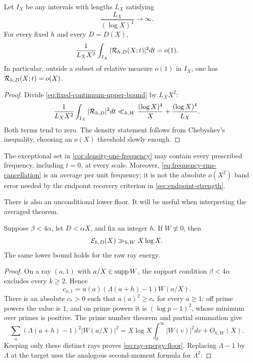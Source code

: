 \begin{corollary}
\label{cor:density-one-frequency}
Let $I_X$ be any intervals with lengths $L_X$ satisfying
\[
 \frac{L_X}{(\log X)^4}\longrightarrow\infty.
\]
For every fixed $h$ and every $D=D(X)$,
\begin{equation}
 \frac1{L_XX^2}\int_{I_X}|\mathcal R_{h,D}(X;t)|^2dt=o(1).
 \label{eq:frequency-rms-cancellation}
\end{equation}
In particular, outside a subset of relative measure $o(1)$ in $I_X$,
one has $\mathcal R_{h,D}(X;t)=o(X)$.
\end{corollary}

\begin{proof}
Divide \eqref{eq:fixed-continuum-upper-bound} by $L_XX^2$:
\[
 \frac1{L_XX^2}\int_{I_X}|\mathcal R_{h,D}|^2dt
 \ll_{h,W}\frac{(\log X)^4}{X}
 +\frac{(\log X)^4}{L_X}.
\]
Both terms tend to zero.  The density statement follows from Chebyshev's
inequality, choosing an $o(X)$ threshold slowly enough.
\end{proof}

\begin{remark}
The exceptional set in \cref{cor:density-one-frequency} may contain every
prescribed frequency, including $t=0$, at every scale.  Moreover,
\eqref{eq:frequency-rms-cancellation} is an average per unit frequency;
it is not the absolute $o(X^2)$ band error needed by the endpoint recovery
criterion in \cref{sec:endpoint-strength}.
\end{remark}

There is also an unconditional lower floor.  It will be useful when
interpreting the averaged theorem.

\begin{proposition}
\label{prop:ray-energy-floor}
Suppose $\beta<4\alpha$, let $D<\alpha X$, and fix an integer $h$.
If $W\not\equiv0$, then
\begin{equation}
 \mathcal E_{h,D}(X)\gg_{h,W}X\log X.
 \label{eq:ray-energy-floor}
\end{equation}
The same lower bound holds for the raw ray energy.
\end{proposition}

\begin{proof}
On a ray $(a,1)$ with $a/X\in\operatorname{supp} W$, the support condition
$\beta<4\alpha$ excludes every $k\geq2$.  Hence
\[
 c_{a,1}=u(a)(\Lambda(a+h)-1)W(a/X).
\]
There is an absolute $c_*>0$ such that $u(a)^2\geq c_*$ for every
$a\geq1$: off prime powers the value is $1$, and on prime powers it is
$(\log p-1)^2$, whose minimum over primes is positive.  The prime number
theorem and partial summation give
\[
 \sum_a(\Lambda(a+h)-1)^2|W(a/X)|^2
 =X\log X\int_0^\infty|W(v)|^2dv+O_{h,W}(X).
\]
Keeping only these distinct rays proves \eqref{eq:ray-energy-floor}.
Replacing $\Lambda-1$ by $\Lambda$ at the target uses the analogous
second-moment formula for $\Lambda^2$.
\end{proof}
